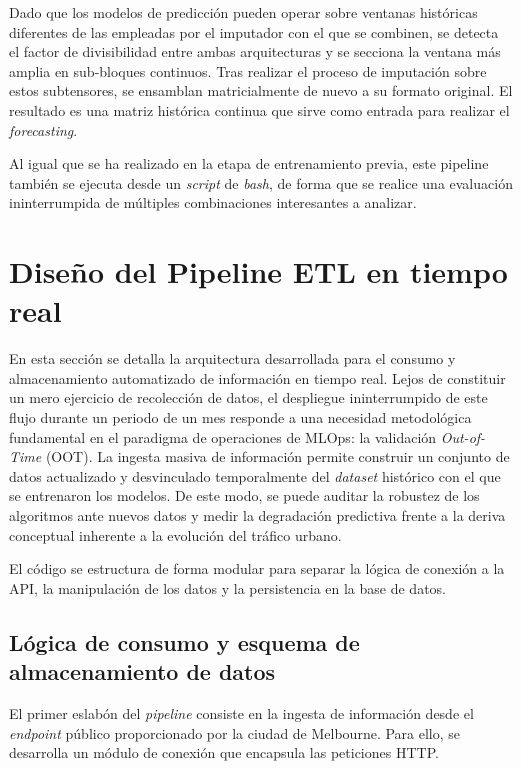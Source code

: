 Dado que los modelos de predicción pueden operar sobre ventanas históricas diferentes de las empleadas por el imputador con el que se combinen, se detecta el factor de divisibilidad entre ambas arquitecturas y se secciona la ventana más amplia en sub-bloques continuos. Tras realizar el proceso de imputación sobre estos subtensores, se ensamblan matricialmente de nuevo a su formato original. El resultado es una matriz histórica continua que sirve como entrada para realizar el \textit{forecasting}.

Al igual que se ha realizado en la etapa de entrenamiento previa, este pipeline también se ejecuta desde un \textit{script} de \textit{bash}, de forma que se realice una evaluación ininterrumpida de múltiples combinaciones interesantes a analizar.






\section{Diseño del Pipeline ETL en tiempo real}
\label{sec:diseño_etl}

En esta sección se detalla la arquitectura desarrollada para el consumo y almacenamiento automatizado de información en tiempo real. Lejos de constituir un mero ejercicio de recolección de datos, el despliegue ininterrumpido de este flujo durante un periodo de un mes responde a una necesidad metodológica fundamental en el paradigma de operaciones de MLOps: la validación \textit{Out-of-Time} (OOT). La ingesta masiva de información permite construir un conjunto de datos actualizado y desvinculado temporalmente del \textit{dataset} histórico con el que se entrenaron los modelos. De este modo, se puede auditar la robustez de los algoritmos ante nuevos datos y medir la degradación predictiva frente a la deriva conceptual inherente a la evolución del tráfico urbano.

El código se estructura de forma modular para separar la lógica de conexión a la API, la manipulación de los datos y la persistencia en la base de datos.

\subsection{Lógica de consumo y esquema de almacenamiento de datos}
\label{subsec:consumo_api}
El primer eslabón del \textit{pipeline} consiste en la ingesta de información desde el \textit{endpoint} público proporcionado por la ciudad de Melbourne. Para ello, se desarrolla un módulo de conexión que encapsula las peticiones HTTP. 

